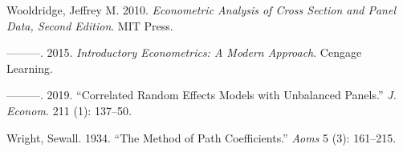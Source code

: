 \documentclass[
  10pt,
]{article}
\begin{document}
\leavevmode\hypertarget{ref-Wooldridge2010}{}%
Wooldridge, Jeffrey M. 2010. \emph{Econometric Analysis of Cross Section
and Panel Data, Second Edition}. MIT Press.

\leavevmode\hypertarget{ref-Wooldridge2015}{}%
---------. 2015. \emph{Introductory Econometrics: A Modern Approach}.
Cengage Learning.

\leavevmode\hypertarget{ref-Wooldridge2019}{}%
---------. 2019. ``Correlated Random Effects Models with Unbalanced
Panels.'' \emph{J. Econom.} 211 (1): 137--50.

\leavevmode\hypertarget{ref-Wright1934}{}%
Wright, Sewall. 1934. ``The Method of Path Coefficients.'' \emph{Aoms} 5
(3): 161--215.
\end{document}
